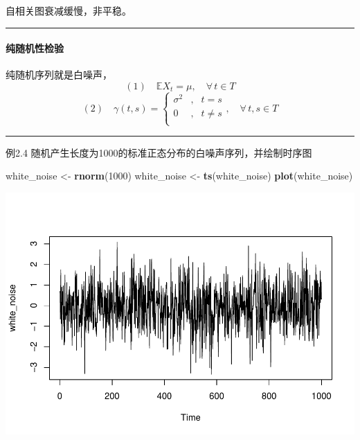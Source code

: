 \documentclass[]{article}
\newenvironment{Shaded}{\begin{snugshade}}{\end{snugshade}}
\newcommand{\DecValTok}[1]{\textcolor[rgb]{0.00,0.00,0.81}{#1}}
\newcommand{\KeywordTok}[1]{\textcolor[rgb]{0.13,0.29,0.53}{\textbf{#1}}}
\newcommand{\NormalTok}[1]{#1}
\newcommand{\StringTok}[1]{\textcolor[rgb]{0.31,0.60,0.02}{#1}}
\let\oldparagraph\paragraph
\renewcommand{\paragraph}[1]{\oldparagraph{#1}\mbox{}}
\begin{document}
自相关图衰减缓慢，非平稳。

\begin{center}\rule{0.5\linewidth}{\linethickness}\end{center}

\hypertarget{ux7eafux968fux673aux6027ux68c0ux9a8c}{%
\paragraph{纯随机性检验}\label{ux7eafux968fux673aux6027ux68c0ux9a8c}}

纯随机序列就是白噪声， \[
(1) \quad \mathbb{E}X_t = \mu , \quad \forall\,t\in T
\] \[
(2) \quad \gamma(t,s) = \left \{
    \begin{array}{clc}
      \sigma^2 & , & t = s \\
          0    & , & t \ne s \\
    \end{array}
  \right. ,\quad \forall\,t,s\in T
\]

\begin{center}\rule{0.5\linewidth}{\linethickness}\end{center}

例2.4 随机产生长度为1000的标准正态分布的白噪声序列，并绘制时序图

\begin{Shaded}
\begin{Highlighting}[]
\NormalTok{white_noise <-}\StringTok{ }\KeywordTok{rnorm}\NormalTok{(}\DecValTok{1000}\NormalTok{)}
\NormalTok{white_noise <-}\StringTok{ }\KeywordTok{ts}\NormalTok{(white_noise)}
\KeywordTok{plot}\NormalTok{(white_noise)}
\end{Highlighting}
\end{Shaded}

\includegraphics{timeseries_files/figure-latex/ex2.4-1.pdf}
\end{document}
